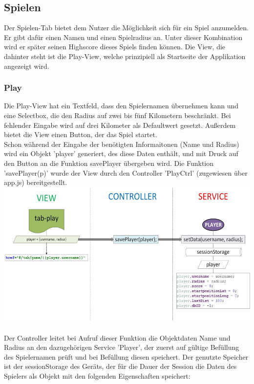 \subsection{Spielen}
Der Spielen-Tab bietet dem Nutzer die Möglichkeit sich für ein Spiel anzumelden. Er gibt dafür einen Namen und einen Spielradius an. Unter dieser Kombination wird er später seinen Highscore dieses Spiels finden können. Die View, die dahinter steht ist die Play-View, welche prinzipiell als Startseite der Applikation angezeigt wird. 
\subsubsection{Play}
Die Play-View hat ein Textfeld, dass den Spielernamen übernehmen kann und eine Selectbox, die den Radius auf zwei bis fünf Kilometern beschränkt. Bei fehlender Eingabe wird auf drei Kilometer als Defaultwert gesetzt. Außerdem bietet die View einen Button, der das Spiel startet. 
\\
Schon während der Eingabe der benötigten Informaitonen (Name und Radius) wird ein Objekt 'player' generiert, des diese Daten enthält, und mit Druck auf den Button an die Funktion savePlayer übergeben wird. Die Funktion 'savePlayer(p)' wurde der View durch den Controller 'PlayCtrl' (zugewiesen über app.js) bereitgestellt.
\\
\includegraphics[width=1\textwidth]{ref/images/play.png} \\ 
\\
Der Controller leitet bei Aufruf dieser Funktion die Objektdaten Name und Radius an den dazugehörigen Service 'Player', der zuerst auf gültige Befüllung des Spielernamen prüft und bei Befüllung diesen speichert. Der genutzte Speicher ist der sessionStorage des Geräts, der für die Dauer der Session die Daten des Spielers als Objekt mit den folgenden Eigenschaften speichert: 
